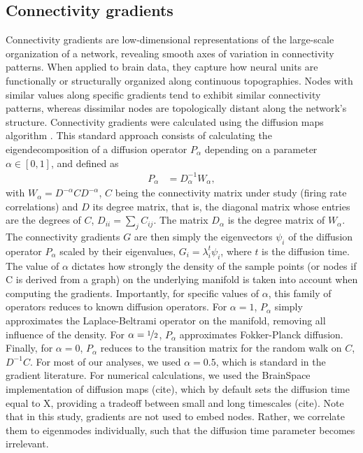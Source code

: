 \documentclass{article}
\begin{document}
\subsection*{Connectivity gradients}

Connectivity gradients are low-dimensional representations of the large-scale organization of a network, revealing smooth axes of variation in connectivity patterns. When applied to brain data, they capture how neural units are functionally or structurally organized along continuous topographies. Nodes with similar values along specific gradients tend to exhibit similar connectivity patterns, whereas dissimilar nodes are topologically distant along the network's structure. Connectivity gradients were calculated using the diffusion maps algorithm \cite{Coifman2006}. This standard approach consists of calculating the eigendecomposition of a diffusion operator $P_\alpha$ depending on a parameter $\alpha \in [0, 1]$, and defined as 
\begin{align*}
    P_\alpha &= D_\alpha^{-1}W_{\alpha},
\end{align*}
with $W_{\alpha} = D^{-\alpha} C D^{-\alpha}$, $C$ being the connectivity matrix under study (firing rate correlations) and $D$ its degree matrix, that is, the diagonal matrix whose entries are the degrees of $C$, $D_{i i} = \sum_{j}C_{ij}$. The matrix $D_\alpha$ is the degree matrix of $W_\alpha$. The connectivity gradients $G$ are then simply the eigenvectors $\psi_i$ of the diffusion operator $P_\alpha$ scaled by their eigenvalues, $G_i=\lambda_i^t\psi_i$, where $t$ is the diffusion time. The value of $\alpha$ dictates how strongly the density of the sample points (or nodes if C is derived from a graph) on the underlying manifold is taken into account when computing the gradients. Importantly, for specific values of $\alpha$, this family of operators reduces to known diffusion operators. For $\alpha = 1$, $P_\alpha$ simply approximates the Laplace-Beltrami operator on the manifold, removing all influence of the density. For $\alpha = \nicefrac{1}{2}$, $P_\alpha$ approximates Fokker-Planck diffusion. Finally, for $\alpha = 0$, $P_\alpha$ reduces to the transition matrix for the random walk on $C$, $D^{-1}C$. For most of our analyses, we used $\alpha=0.5$, which is standard in the gradient literature. For numerical calculations, we used the BrainSpace implementation of diffusion maps (cite), which by default sets the diffusion time equal to X, providing a tradeoff between small and long timescales (cite). Note that in this study, gradients are not used to embed nodes. Rather, we correlate them to eigenmodes individually, such that the diffusion time parameter becomes irrelevant.
\end{document}
